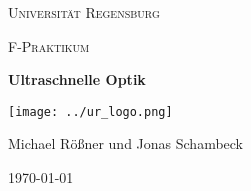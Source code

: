 \begin{titlepage}
	\centering
	{\scshape \LARGE Universität Regensburg \par}
	\vspace{1cm}
	{\scshape\Large F-Praktikum\par}
	\vspace{1.5cm}
	{\huge\bfseries Ultraschnelle Optik\par}
	\vspace{2cm}
	\texttt{[image: ../ur\_logo.png]}\par
	\vfill
	{\large Michael Rößner und Jonas Schambeck\par}

	\vfill

	{\large \today\par}
\end{titlepage}
